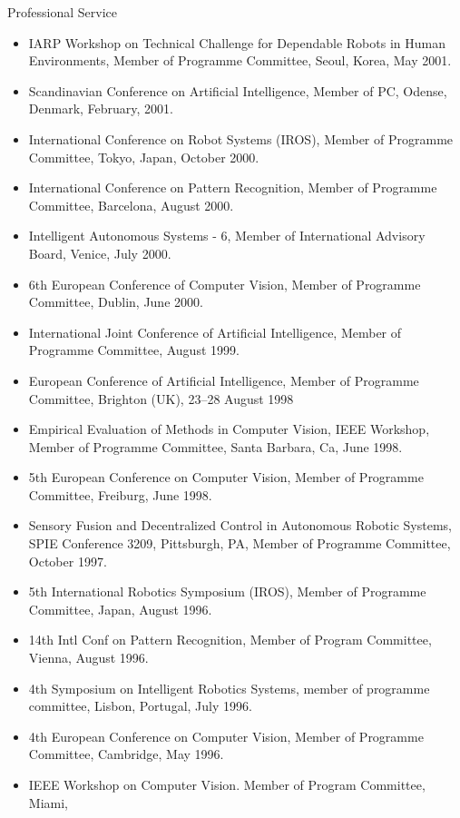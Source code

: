 \documentclass{article}
\begin{document}
\begin{cv}
\begin{cvlist}{Professional Service}
\begin{itemize}
    \item IARP Workshop on Technical Challenge for Dependable Robots in Human
          Environments, Member of Programme Committee, Seoul, Korea, May 2001.
    \item Scandinavian Conference on Artificial Intelligence, Member of PC, Odense,
          Denmark, February, 2001.
    \item International Conference on Robot Systems (IROS), Member of Programme
          Committee, Tokyo, Japan, October 2000.
    \item International Conference on Pattern Recognition, Member of Programme
          Committee, Barcelona, August 2000.
    \item Intelligent Autonomous Systems - 6, Member of International Advisory
          Board, Venice, July 2000.
    \item 6th European Conference of Computer Vision, Member of Programme Committee,
          Dublin, June 2000.
    \item International Joint Conference of Artificial Intelligence, Member of
          Programme Committee, August 1999.
    \item European Conference of Artificial Intelligence, Member of Programme
          Committee, Brighton (UK), 23--28 August 1998
    \item Empirical Evaluation of Methods in Computer Vision, IEEE Workshop, Member
          of Programme Committee, Santa Barbara, Ca, June 1998.
    \item 5th European Conference on Computer Vision, Member of Programme Committee,
          Freiburg, June 1998.
    \item Sensory Fusion and Decentralized Control in Autonomous Robotic Systems,
          SPIE Conference 3209, Pittsburgh, PA, Member of Programme Committee,
          October 1997.
    \item 5th International Robotics Symposium (IROS), Member of Programme
          Committee, Japan, August 1996.
    \item 14th Intl Conf on Pattern Recognition, Member of Program Committee,
          Vienna, August 1996.
    \item 4th Symposium on Intelligent Robotics Systems, member of programme
          committee, Lisbon, Portugal, July 1996.
    \item 4th European Conference on Computer Vision, Member of Programme Committee,
          Cambridge, May 1996.
    \item IEEE Workshop on Computer Vision. Member of Program Committee, Miami,

\end{itemize}
\end{cvlist}
\end{cv}
\end{document}
